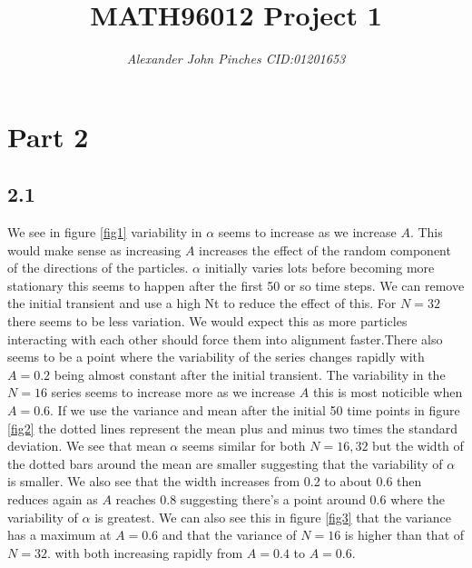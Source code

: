 \documentclass{article}
\title{MATH96012 Project 1}
\author{\emph{Alexander John Pinches CID:01201653}}
\begin{document}
\maketitle


\section*{Part 2}
\subsection{2.1}
We see in figure \ref{fig1} variability in $\alpha$ seems to increase as we increase $A$. This would make sense as increasing $A$ increases the effect of the random component of the directions of the particles. $\alpha$ initially varies lots before becoming more stationary this seems to happen after the first 50 or so time steps. We can remove the initial transient and use a high Nt to reduce the effect of this. For $N=32$ there seems to be less variation. We would expect this as more particles interacting with each other should force them into alignment faster.There also seems to be a point where the variability of the series changes rapidly with $A=0.2$ being almost constant after the initial transient. The variability in the $N=16$ series seems to increase more as we increase $A$ this is most noticible when $A=0.6$. If we use the variance and mean after the initial 50 time points in figure \ref{fig2} the dotted lines represent the mean plus and minus two times the standard deviation. We see that mean $\alpha$ seems similar for both $N=16,32$ but the width of the dotted bars around the mean are smaller suggesting that the variability of $\alpha$ is smaller. We also see that the width increases from 0.2 to about 0.6 then reduces again as $A$ reaches 0.8 suggesting there's a point around 0.6 where the variability of $\alpha$ is greatest. We can also see this in figure \ref{fig3} that the variance has a maximum at $A=0.6$ and that the variance of $N=16$ is higher than that of $N=32$. with both increasing rapidly from $A=0.4$ to $A=0.6$.
\end{document}
